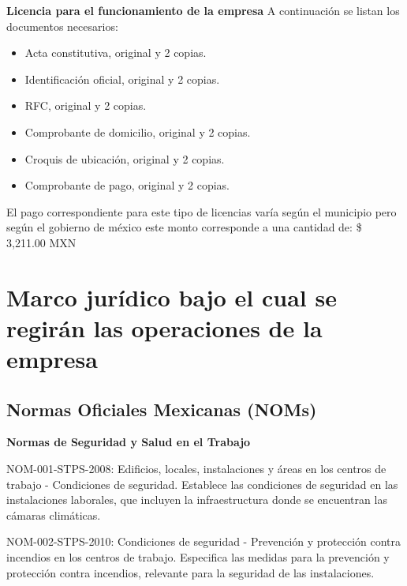 \textbf{Licencia para el funcionamiento de la empresa}
A continuación se listan los documentos necesarios:
\begin{itemize}
    \item Acta constitutiva, original y 2 copias.
    \item Identificación oficial, original y 2 copias.
    \item RFC, original y 2 copias.
    \item Comprobante de domicilio, original y 2 copias.
    \item Croquis de ubicación, original y 2 copias.
    \item Comprobante de pago, original y 2 copias.
\end{itemize}

El pago correspondiente para este tipo de licencias varía según el municipio pero según el gobierno de méxico este monto corresponde a una cantidad de: \$ 3,211.00 MXN \cite{Licencia2024Mexico}



\section{Marco jurídico bajo el cual se regirán las operaciones de la empresa}

\subsection{ Normas Oficiales Mexicanas (NOMs)}

\textbf{Normas de Seguridad y Salud en el Trabajo}

NOM-001-STPS-2008: Edificios, locales, instalaciones y áreas en los centros de trabajo - Condiciones de seguridad.
Establece las condiciones de seguridad en las instalaciones laborales, que incluyen la infraestructura donde se encuentran las cámaras climáticas.

NOM-002-STPS-2010: Condiciones de seguridad - Prevención y protección contra incendios en los centros de trabajo.
Especifica las medidas para la prevención y protección contra incendios, relevante para la seguridad de las instalaciones.

